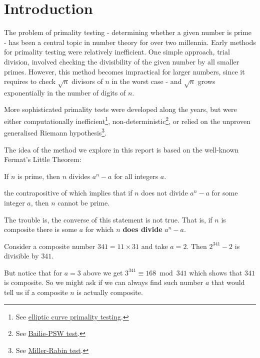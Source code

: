 \documentclass[../main.tex]{subfiles}
\begin{document}
\section{Introduction}

The problem of primality testing - determining whether a given number is prime - has been a central topic in number theory for over two millennia. Early methods for primality testing were relatively inefficient. One simple approach, trial division, involved checking the divisibility of the given number by all smaller primes. However, this method becomes impractical for larger numbers, since it requires to check $\sqrt{n}$ divisors of $n$ in the worst case - and $\sqrt{n}$ grows exponentially in the number of digits of $n$.

More sophisticated primality tests were developed along the years, but were either computationally inefficient\footnote{See \href{https://en.wikipedia.org/wiki/Elliptic_curve_primality}{elliptic curve primality testing}.}, non-deterministic\footnote{See \href{https://en.wikipedia.org/wiki/Baillie\%E2\%80\%93PSW_primality_test}{Bailie-PSW test}.}, or relied on the unproven generalised Riemann hypothesis\footnote{See \href{https://en.wikipedia.org/wiki/Miller\%E2\%80\%93Rabin_primality_test}{Miller-Rabin test}.}.

The idea of the method we explore in this report is based on the well-known Fermat's Little Theorem:

\begin{theorem} \label{theorem: flt}
    If $n$ is prime, then $n$ divides $a^{n} - a$ for all integers $a$.
\end{theorem}

the contrapositive of which implies that if $n$ does not divide $a^{n} - a$ for some integer $a$, then $n$ cannot be prime. 

The trouble is, the converse of this statement is not true. That is, if $n$ is composite there is some $a$ for which  $n$ \textbf{does divide} $a^{n} - a$.

\begin{tcolorbox}[title=Example]
    Consider a composite number $341 = 11 \times 31$ and take $a = 2$. Then $2^{341} - 2$ is divisible by $341$.
\end{tcolorbox}

But notice that for $a = 3$ above we get $3^{341} \equiv 168 \bmod 341$ which shows that $341$ is composite. So we might ask if we can always find such number $a$ that would tell us if a composite $n$ is actually composite.
\end{document}
